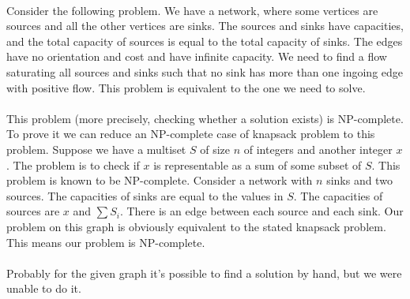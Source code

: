 \paragraph{}
Consider the following problem. We have a network, where some vertices are sources and all the other vertices are sinks. The sources and sinks have capacities, and the total capacity of sources is equal to the total capacity of sinks. The edges have no orientation and cost and have infinite capacity. We need to find a flow saturating all sources and sinks such that no sink has more than one ingoing edge with positive flow. This problem is equivalent to the one we need to solve.

\paragraph{}
This problem (more precisely, checking whether a solution exists) is NP-complete. To prove it we can reduce an NP-complete case of knapsack problem to this problem. Suppose we have a multiset $S$ of size $n$ of integers and another integer $x$. The problem is to check if $x$ is representable as a sum of some subset of $S$. This problem is known to be NP-complete. Consider a network with $n$ sinks and two sources. The capacities of sinks are equal to the values in $S$. The capacities of sources are $x$ and $\sum S_i$. There is an edge between each source and each sink. Our problem on this graph is obviously equivalent to the stated knapsack problem. This means our problem is NP-complete.

\paragraph{}
Probably for the given graph it's possible to find a solution by hand, but we were unable to do it.

